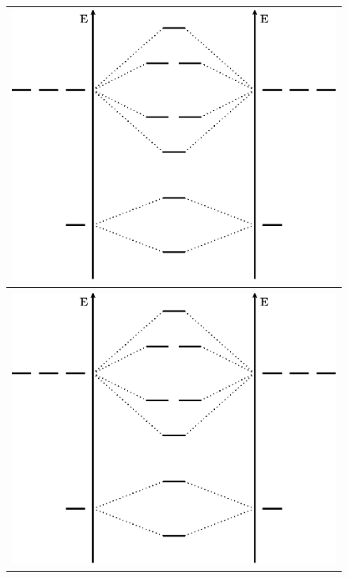\begin{figure}[!h]
\begin{center}
\begin{tabular}{c}
\includegraphics[height=0.4\textheight]{figure/diagOM.eps}\\[0.25cm]
\hline \\[0.25cm]
\includegraphics[height=0.4\textheight]{figure/diagOM.eps}\\
\end{tabular}
\end{center}
\end{figure}

